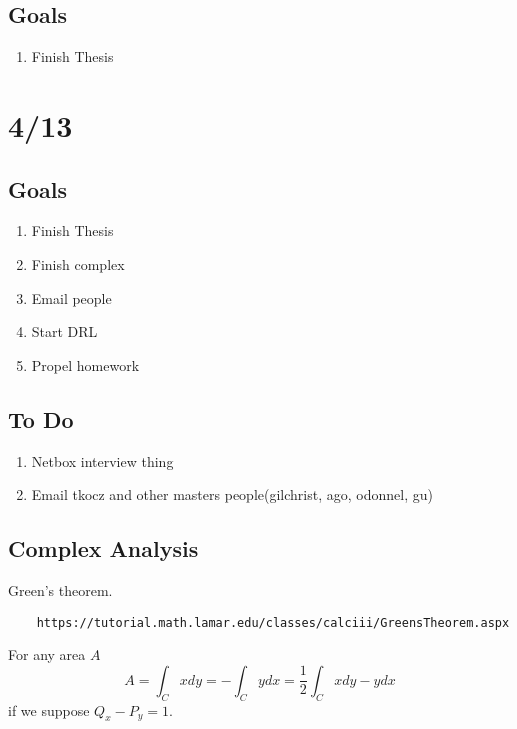 \documentclass[11pt]{article}
\theoremstyle{remark}
\begin{document}
\subsection{Goals}

\begin{enumerate}
	\item Finish Thesis
\end{enumerate}

\section{4/13}

\subsection{Goals}

\begin{enumerate}
	\item Finish Thesis
	\item Finish complex
	\item Email people
	\item Start DRL
	\item Propel homework
\end{enumerate}

\subsection{To Do}

\begin{enumerate}
	\item Netbox interview thing
	\item Email tkocz and other masters people(gilchrist, ago, odonnel, gu)
\end{enumerate}

\subsection{Complex Analysis}

Green's theorem.

\begin{verbatim}
	https://tutorial.math.lamar.edu/classes/calciii/GreensTheorem.aspx
\end{verbatim}

For any area $A$ 
\begin{equation*}
	A = \int_C xdy = -\int_C ydx = \frac{1}{2}\int_C xdy - y dx
\end{equation*} if we suppose $Q_x - P_y = 1$. 
\end{document}
